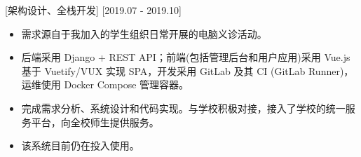 \documentclass{resume}
\begin{document}
[架构设计、全栈开发]
[2019.07 - 2019.10] 

\begin{itemize}
  \item 需求源自于我加入的学生组织日常开展的电脑义诊活动。
  \item 后端采用 Django + REST API；前端(包括管理后台和用户应用)采用 Vue.js 基于 Vuetify/VUX 实现 SPA，开发采用 GitLab 及其 CI (GitLab Runner)，运维使用 Docker Compose 管理容器。
  \item 完成需求分析、系统设计和代码实现。与学校积极对接，接入了学校的统一服务平台，向全校师生提供服务。
  \item 该系统目前仍在投入使用。
\end{itemize}
\end{document}
